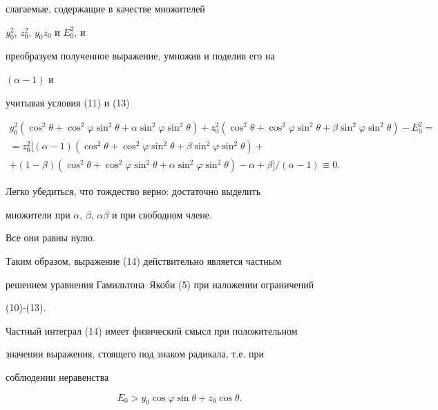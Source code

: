 слагаемые, содержащие в качестве множителей


$y^2_0$, $z^2_0$, $y_0z_0$ и $E^2_0$, и


преобразуем полученное выражение, умножив и поделив его на


$(\alpha-1)$ и


учитывая условия (11) и (13)


\begin{multline*}


y^2_0(\cos^2\theta+\cos^2\varphi\sin^2\theta+


\alpha\sin^2\varphi\sin^2\theta)+z^2_0


(\cos^2\theta+\cos^2\varphi\sin^2\theta+\beta\sin^2\varphi


\sin^2\theta)-E^2_0=\\


=z^2_0[(\alpha-1)(\cos^2\theta+\cos^2\varphi\sin^2\theta+\beta


\sin^2\varphi\sin^2\theta)+\\


+(1-\beta)


(\cos^2\theta+\cos^2\varphi\sin^2\theta+


\alpha\sin^2\varphi\sin^2\theta)-\alpha+\beta]/(\alpha-1)\equiv 0.


\end{multline*}





Легко убедиться, что тождество верно: достаточно выделить


множители при $\alpha$, $\beta$, $\alpha\beta$ и при свободном члене.


Все они равны нулю.


Таким образом, выражение (14) действительно является частным


решением уравнения Гамильтона--Якоби (5) при наложении ограничений


(10)-(13).





Частный интеграл (14) имеет физический смысл при положительном


значении выражения, стоящего под знаком радикала, т.е. при


соблюдении неравенства


$$


E_0>y_0\cos\varphi\sin\theta+z_0\cos\theta.


$$





